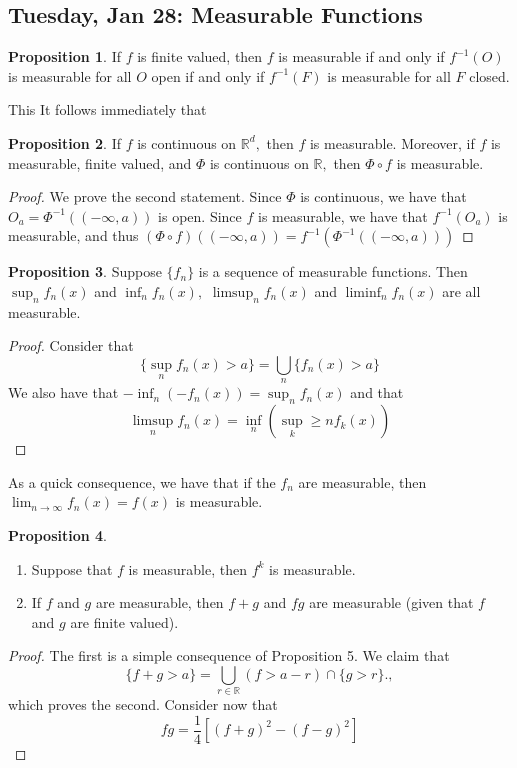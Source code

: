 \documentclass[10pt, oneside]{article}
\newcommand{\bbR}{\mathbb{R}}
\theoremstyle{definition}
\newtheorem{prop}{Proposition}
\begin{document}
\newpage
\subsection{Tuesday, Jan 28: Measurable Functions}
\begin{prop}
    If $f$ is finite valued, then $f$ is measurable if and only if $f^{-1}(O)$ is measurable for all $O$ open if and only if $f^{-1}(F)$ is measurable for all $F$ closed. 
\end{prop}
This It follows immediately that
\begin{prop}
    If $f$ is continuous on $\bbR^d,$ then $f$ is measurable. Moreover, if $f$ is measurable, finite valued, and $\Phi$ is continuous on $\bbR,$ then $\Phi \circ f$ is measurable.
\end{prop}
\begin{proof}
    We prove the second statement. Since $\Phi$ is continuous, we have that $O_a =  \Phi^{-1}((-\infty, a))$ is open. Since $f$ is measurable, we have that $f^{-1}(O_a)$ is measurable, and thus $(\Phi\circ f) ((-\infty, a )) = f^{-1}(\Phi^{-1}((-\infty, a)))$ 
\end{proof}

\begin{prop}
    Suppose $\{f_n\}$ is a sequence of measurable functions. Then $\sup_n f_n(x)$ and $\inf_n f_n(x),$ $\limsup_n f_n(x)$ and $\liminf_n f_n(x)$ are all measurable.
\end{prop}
\begin{proof}
    Consider that \[ \{\sup_n f_n(x) > a\} = \bigcup_n \{f_n(x) > a\}\] We also have that $-\inf_n(-f_n(x)) = \sup_n f_n(x)$ and that 
    \[\limsup_n f_n(x) = \inf_n(\sup_k\geq n f_k(x))\]
\end{proof}
As a quick consequence, we have that if the $f_n$ are measurable, then $\lim_{n\to \infty} f_n(x) = f(x)$ is measurable.
\begin{prop}
    \begin{enumerate}
        \item Suppose that $f$ is measurable, then $f^k$ is measurable.
        \item If $f$ and $g$ are measurable, then $f + g$ and $fg$ are measurable (given that $f$ and $g$ are finite valued).
    \end{enumerate}
\end{prop}
\begin{proof}
    The first is a simple consequence of Proposition 5. We claim that 
    \[\{f + g > a\} = \bigcup_{r\in \bbR}(f > a-r) \cap \{g > r\}.,\] which proves the second. Consider now that 
    \[fg = \frac{1}{4}\left[(f + g)^2 - (f - g)^2\right]\]
\end{proof}
\end{document}
